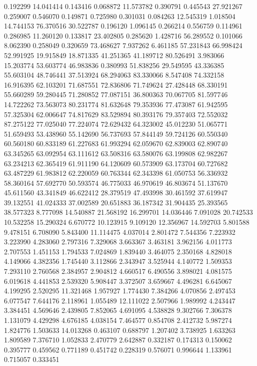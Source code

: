 0.192299
14.041414
0.143416
0.068872
11.573782
0.390791
0.445543
27.921267
0.259007
0.546070
0.149871
0.725980
0.301031
0.084263
12.545319
1.018504
14.744153
76.370516
30.522787
0.196120
1.096145
0.266214
0.556759
0.114961
0.286985
11.260120
0.133817
23.402805
0.285620
1.428716
56.289552
0.101066
8.062390
0.258049
0.320659
73.468627
7.937262
6.461185
57.231843
66.998424
52.991925
19.915849
18.871335
41.251365
41.189712
80.526491
3.983066
15.203774
53.603774
46.983836
0.380993
51.838256
29.549595
43.336385
55.603104
48.746441
37.513924
68.294063
83.330066
8.547408
74.332158
16.916395
62.103201
71.687551
72.836806
71.749624
27.428448
68.330191
55.660289
59.280445
71.280852
77.087151
36.800363
70.067705
81.597746
14.722262
73.563073
80.231774
81.632648
79.353936
77.473087
61.942595
57.325304
62.006647
74.817629
83.529894
80.393176
79.357403
72.552032
87.275122
77.025040
77.224074
72.629432
64.323002
45.012230
51.065771
51.659493
53.438960
55.142690
56.737693
57.844149
59.724126
60.550340
60.560180
60.833189
61.227683
61.993294
62.059670
62.839003
62.890740
63.345265
63.092954
63.111612
63.508316
63.580076
63.199808
62.982267
63.234213
62.365419
61.911190
64.120609
60.573909
63.173704
60.727682
63.487229
61.983812
62.220059
60.763344
62.343398
61.050753
56.336932
58.360164
57.692770
50.593574
46.775033
46.970619
46.803674
51.137670
45.611560
43.341849
46.622412
28.379519
47.493998
30.461592
37.619947
39.132551
41.024333
37.002589
20.651883
36.187342
31.904435
25.393565
38.577323
8.777098
14.540887
21.568192
16.299701
14.036446
7.091028
20.742533
10.532258
15.290324
6.670772
10.123915
9.109120
12.356967
14.592703
5.801588
9.478151
6.708090
5.843400
11.114475
4.037014
2.801472
7.544356
7.223932
3.223990
4.283060
2.797316
7.329068
3.663367
3.463181
3.962156
4.011773
2.707553
1.451153
1.794533
7.024869
1.839440
3.464075
2.350168
4.828018
4.149066
4.382356
1.745440
3.112866
2.343947
3.525944
4.140772
1.509353
7.293110
2.760568
2.384957
2.904812
4.660517
6.490556
3.898021
4.081575
6.019618
4.441853
2.539320
5.908447
3.372507
3.659667
4.496281
6.645067
4.199295
2.520295
11.321468
1.957927
1.774430
7.384266
4.070856
2.497453
6.077547
7.644176
2.118961
1.055489
12.111022
2.507966
1.989992
4.243447
3.384451
4.569646
2.439805
7.852065
4.691095
4.538828
9.302766
7.306378
1.131079
4.429298
4.676185
4.038154
7.464577
0.854708
2.412732
5.987274
1.824776
1.503633
14.013268
0.463107
0.688797
1.207402
3.738925
1.633263
1.809589
7.376710
1.052833
2.470779
2.642887
0.332187
0.174313
0.150062
0.395777
0.459562
0.771189
0.451742
0.228319
0.576071
0.996644
1.133961
0.715057
0.333451
